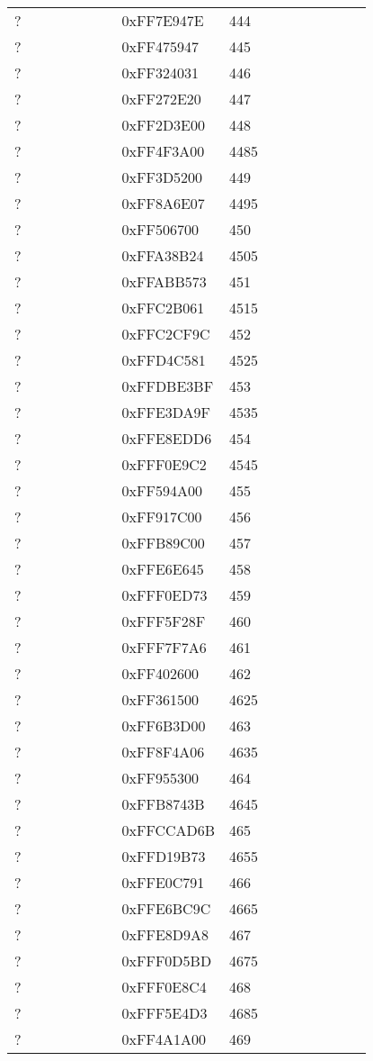 \begin{longtable}{p{0.3\linewidth} p{0.3\linewidth} p{0.4\linewidth}}
? &  0xFF7E947E &  444\\
? &  0xFF475947 &  445\\
? &  0xFF324031 &  446\\
? &  0xFF272E20 &  447\\
? &  0xFF2D3E00 &  448\\
? &  0xFF4F3A00 &  4485\\
? &  0xFF3D5200 &  449\\
? &  0xFF8A6E07 &  4495\\
? &  0xFF506700 &  450\\
? &  0xFFA38B24 &  4505\\
? &  0xFFABB573 &  451\\
? &  0xFFC2B061 &  4515\\
? &  0xFFC2CF9C &  452\\
? &  0xFFD4C581 &  4525\\
? &  0xFFDBE3BF &  453\\
? &  0xFFE3DA9F &  4535\\
? &  0xFFE8EDD6 &  454\\
? &  0xFFF0E9C2 &  4545\\
? &  0xFF594A00 &  455\\
? &  0xFF917C00 &  456\\
? &  0xFFB89C00 &  457\\
? &  0xFFE6E645 &  458\\
? &  0xFFF0ED73 &  459\\
? &  0xFFF5F28F &  460\\
? &  0xFFF7F7A6 &  461\\
? &  0xFF402600 &  462\\
? &  0xFF361500 &  4625\\
? &  0xFF6B3D00 &  463\\
? &  0xFF8F4A06 &  4635\\
? &  0xFF955300 &  464\\
? &  0xFFB8743B &  4645\\
? &  0xFFCCAD6B &  465\\
? &  0xFFD19B73 &  4655\\
? &  0xFFE0C791 &  466\\
? &  0xFFE6BC9C &  4665\\
? &  0xFFE8D9A8 &  467\\
? &  0xFFF0D5BD &  4675\\
? &  0xFFF0E8C4 &  468\\
? &  0xFFF5E4D3 &  4685\\
? &  0xFF4A1A00 &  469\\

\end{longtable}
